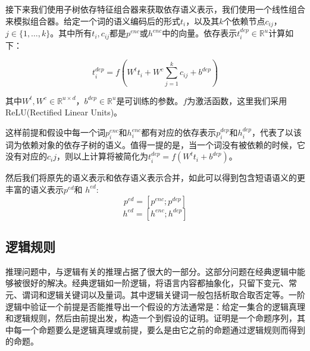 \documentclass[UTF8,11pt,a4paper,nofonts]{ctexart}
\numberwithin{equation}{section}
\begin{document}


接下来我们使用子树依存特征组合器来获取依存语义表示，我们使用一个线性组合来模拟组合器。给定一个词的语义编码后的形式$t_{i}$，以及其$k$个依赖节点$c_{ij}$，$j \in \{1,\dots,k\}$。其中所有$t_{i}, c_{ij}$都是$p^{enc}$或$h^{enc}$中的向量。依存表示$t^{dep}_i \in \mathbb{R}^u$计算如下：

\begin{equation}
t^{dep}_i = f(W^t t_i + W^c  \sum^{k}_{j=1}c_{ij} + b^{dep})
\end{equation}

其中$W^t, W^c \in \mathbb{R}^{u \times d}$，$b^{dep} \in \mathbb{R}^{u}$是可训练的参数。$f$为激活函数，这里我们采用ReLU(Rectified Linear Units)。

这样前提和假设中每一个词$p^{enc}_i$和$h^{enc}_i$都有对应的依存表示$p^{dep}_i$和$h^{dep}_i$，代表了以该词为依赖对象的依存子树的语义。值得一提的是，当一个词没有被依赖的时候，它没有对应的$c_ij$，则以上计算将被简化为$t^{dep}_i = f(W^t t_i + b^{dep})$。

然后我们将原先的语义表示和依存语义表示合并，如此可以得到包含短语语义的更丰富的语义表示$p^{ed}$和 $h^{ed}$:
\begin{equation}
p^{ed} = [p^{enc}; p^{dep}]
\end{equation}
\begin{equation}
h^{ed} = [h^{enc}; h^{dep}]
\end{equation}


\subsection{逻辑规则}


推理问题中，与逻辑有关的推理占据了很大的一部分。这部分问题在经典逻辑中能够被很好的解决。经典逻辑如一阶逻辑，将语言内容都抽象化，只留下变元、常元、谓词和逻辑关键词以及量词。其中逻辑关键词一般包括析取合取否定等。一阶逻辑中验证一个前提是否能推导出一个假设的方法通常是：给定一集合的逻辑真理和逻辑规则，然后由前提出发，构造一个到假设的证明。证明是一个命题序列，其中每一个命题要么是逻辑真理或前提，要么是由它之前的命题通过逻辑规则而得到的命题。
\end{document}
